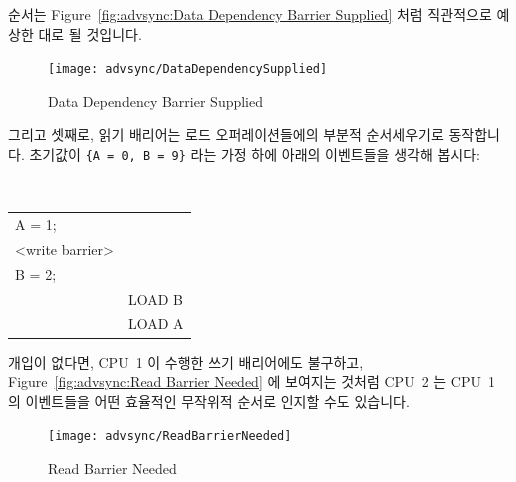 \begin{enumerate}
순서는 Figure~\ref{fig:advsync:Data Dependency Barrier Supplied} 처럼
직관적으로 예상한 대로 될 것입니다.

\begin{figure}[htbp]
\centering
\texttt{[image: advsync/DataDependencySupplied]}
\caption{Data Dependency Barrier Supplied}
\end{figure}

그리고 셋째로, 읽기 배리어는 로드 오퍼레이션들에의 부분적 순서세우기로
동작합니다.
초기값이 {\tt \{A = 0, B = 9\}} 라는 가정 하에 아래의 이벤트들을 생각해 봅시다:

\vspace{5pt}
\begin{minipage}[t]{\columnwidth}
\tt
\scriptsize
\begin{tabular}{l|p{1.5in}}
	\nf{CPU 1} &	\nf{CPU 2} \\
	\hline
	A = 1; & \\
	<write barrier> & \\
	B = 2; & \\
		&	LOAD B \\
		&	LOAD A \\
\end{tabular}
\end{minipage}
\vspace{5pt}

개입이 없다면, CPU~1 이 수행한 쓰기 배리어에도 불구하고,
Figure~\ref{fig:advsync:Read Barrier Needed} 에 보여지는 것처럼 CPU~2 는 CPU~1
의 이벤트들을 어떤 효율적인 무작위적 순서로 인지할 수도 있습니다.

\begin{figure}[htbp]
\centering
\texttt{[image: advsync/ReadBarrierNeeded]}
\caption{Read Barrier Needed}
\end{figure}


\end{enumerate}
